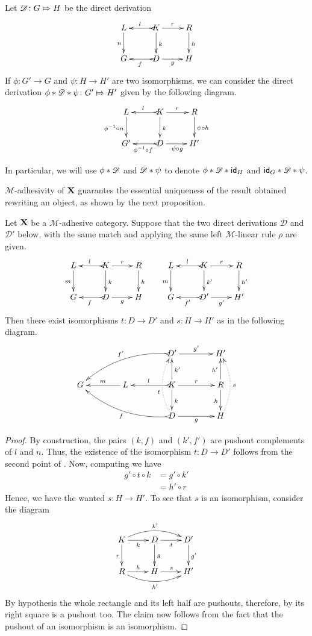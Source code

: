 \begin{remark}\label{exa:conc} Let  $\mathscr{D}\colon G\Mapsto H$ be the direct derivation 
	\[\xymatrix{L \ar[d]_{n}& K \ar[d]^{k}\ar@{>->}[l]_{l} \ar[r]^{r} & R \ar[d]^{h}\\G & \ar@{>->}[l]^{f} D \ar[r]_{g}& H}\]
	If $\phi\colon G'\to G$ and $\psi\colon H\to H'$ are two isomorphisms, 	we can consider the direct derivation	$\phi * \mathscr{D}*\psi \colon G'\Mapsto H'$ given by the following diagram.
	\[\xymatrix{L \ar[d]_{\phi^{-1} \circ n}& K \ar[d]^{k}\ar@{>->}[l]_{l} \ar[r]^{r} & R \ar[d]^{\psi \circ h}\\G' & \ar@{>->}[l]^{\phi^{-1} \circ f} D \ar[r]_{\psi \circ g}& H'}\]
	
	In particular, we will use $\phi*\mathscr{D}$ and $\mathscr{D}*\psi$  to denote $\phi*\mathscr{D}*\mathsf{id}_{H}$ and $\mathsf{id}_{G}*\mathscr{D}*\psi$.
\end{remark}



$\mathcal{M}$-adhesivity of $\textbf {\textup{X}}$ guarantes the essential uniqueness of the result obtained rewriting an object, as shown by the next proposition.

\begin{proposition}\label{prop:unique} Let $\textbf {\textup{X}}$  be a $\mathcal{M}$-adhesive category. Suppose that the two direct derivations $\mathscr{D}$ and $\mathscr{D'}$ below, with the same match and applying the same left $\mathcal{M}$-linear rule $\rho$ are given.
	\[\xymatrix{L \ar[d]_{m}& K \ar[d]^{k}\ar@{>->}[l]_{l} \ar[r]^{r} & R \ar[d]^{h} & L \ar[d]_{m}& K \ar[d]^{k'}\ar@{>->}[l]_{l} \ar[r]^{r} & R \ar[d]^{h'}\\G & \ar@{>->}[l]^{f} D \ar[r]_{g}& H & G & \ar@{>->}[l]^{f'} D' \ar[r]_{g'}& H'}\]
	Then there exist isomorphisms $t\colon D\to D'$ and $s\colon H\to H'$ as in the following diagram.
	\[\xymatrix@C=40pt{&&D' \ar[r]^{g'} \ar@{>->}@/_.45cm/[dll]_{f'}&H'\\G & L \ar[l]_{m} & K \ar[u]_{k'} \ar[d]^{k}\ar[r]^{r} \ar@{>->}[l]_{l} &R\ar[u]^{h'} \ar[d]_{h}\\&&D\ar@{>->}@/^.45cm/[ull]^{f}\ar@/^.4cm/@{.>}[uu]^(.4){t}|\hole \ar[r]_{g}&H\ar@/_.4cm/@{.>}[uu]_{s}}\]
\end{proposition}
\begin{proof}
	By construction, the pairs $(k, f)$ and $(k', f')$ are pushout complements of $l$ and $n$. Thus, the existence of the isomorphism $t\colon D\to D'$ follows from the second point of . Now, computing we have
	\begin{align*}
		g'\circ t \circ k &= g' \circ k'\\&=h'\circ r
	\end{align*}
	Hence, we have the wanted $s\colon H\to H'$. To see that $s$ is an isomorphism, consider the diagram 
	\[\xymatrix{K  \ar@/^.4cm/[rr]^{k'}\ar[d]_{r} \ar[r]_{k}& \ar[r]_{t} D \ar[d]^{g}& D' \ar[d]^{g'}\\ R \ar@/_.4cm/[rr]_{h'} \ar[r]^{h}& H \ar[r]^{s}& H'}\]
	By hypothesis the whole rectangle and its left half are pushouts, therefore, by  its right square is a pushout too. The claim now follows from the fact that the pushout of an isomorphism is an isomorphism.
\end{proof}

